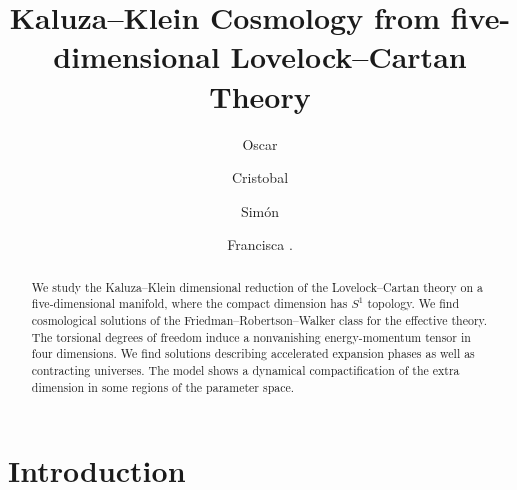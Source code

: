 \documentclass[aps,prd,12pt,superscriptaddress,showpacs,showkeys,longbibliography,reprint,nofootinbib]{revtex4-1}
\begin{document}
\title{Kaluza--Klein Cosmology from five-dimensional Lovelock--Cartan Theory}

\author{Oscar }

\author{Cristobal }

\author{Sim\'on }

\author{Francisca .}

\begin{abstract}
  We study the Kaluza--Klein dimensional reduction of the Lovelock--Cartan theory on a five-dimensional manifold, where the compact dimension has $S^1$ topology. We find cosmological solutions of the Friedman--Robertson--Walker class for the effective theory.
  The torsional degrees of freedom induce a nonvanishing energy-momentum tensor in four dimensions. We find solutions describing accelerated expansion phases as well as contracting universes. The model shows a dynamical compactification of the extra dimension in some regions of the parameter space. 
\end{abstract}



\maketitle

\section{Introduction}
\end{document}
